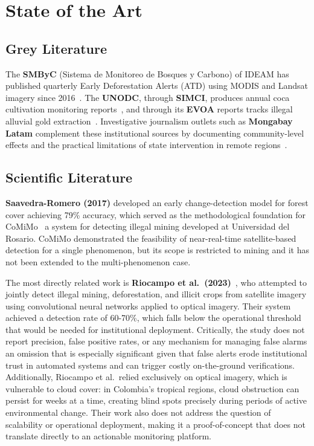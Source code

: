 \documentclass{article}
\begin{document}
\section{State of the Art}
\label{sec:sota}

\subsection{Grey Literature}

The \textbf{SMByC} (Sistema de Monitoreo de Bosques y Carbono) of IDEAM has
published quarterly Early Deforestation Alerts (ATD) using MODIS and Landsat
imagery since 2016~\cite{ideam_smbyc,smbyc_atd_github}.
The \textbf{UNODC}, through \textbf{SIMCI}, produces annual coca cultivation
monitoring reports~\cite{minjusticia_coca2023}, and through its \textbf{EVOA}
reports tracks illegal alluvial gold extraction~\cite{infobae_evoa2023}.
Investigative journalism outlets such as \textbf{Mongabay Latam} complement these
institutional sources by documenting community-level effects and the practical
limitations of state intervention in remote
regions~\cite{mongabay_siona2023,mongabay_riopure2026}.

\subsection{Scientific Literature}

\textbf{Saavedra-Romero (2017)} developed an early change-detection model for
forest cover achieving 79\% accuracy, which served as the methodological
foundation for CoMiMo~\cite{comimo_urosario} a system for detecting illegal
mining developed at Universidad del Rosario.
CoMiMo demonstrated the feasibility of near-real-time satellite-based detection
for a single phenomenon, but its scope is restricted to mining and it has not
been extended to the multi-phenomenon case.

The most directly related work is \textbf{Riocampo et al.\ (2023)}~\cite{riocampo2023},
who attempted to jointly detect illegal mining, deforestation, and illicit crops
from satellite imagery using convolutional neural networks applied to optical
imagery.
Their system achieved a detection rate of 60-70\%, which falls below the
operational threshold that would be needed for institutional deployment.
Critically, the study does not report precision, false positive rates, or
any mechanism for managing false alarms an omission that is especially
significant given that false alerts erode institutional trust in automated
systems and can trigger costly on-the-ground verifications.
Additionally, Riocampo et al.\ relied exclusively on optical imagery, which is
vulnerable to cloud cover: in Colombia's tropical regions, cloud obstruction
can persist for weeks at a time, creating blind spots precisely during
periods of active environmental change.
Their work also does not address the question of scalability or operational
deployment, making it a proof-of-concept that does not translate directly
to an actionable monitoring platform.
\end{document}
